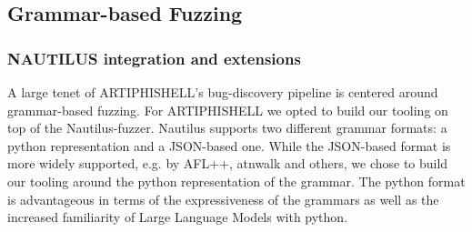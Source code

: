 \subsection{Grammar-based Fuzzing}

\subsubsection{NAUTILUS integration and extensions}

A large tenet of ARTIPHISHELL's bug-discovery pipeline is centered around grammar-based fuzzing. For ARTIPHISHELL we opted to build our tooling on top of the Nautilus-fuzzer. Nautilus supports two different grammar formats: a python representation and a JSON-based one. While the JSON-based format is more widely supported, e.g. by AFL++, atnwalk and others, we chose to build our tooling around the python representation of the grammar. The python format is advantageous in terms of the expressiveness of the grammars as well as the increased familiarity of Large Language Models with python.


